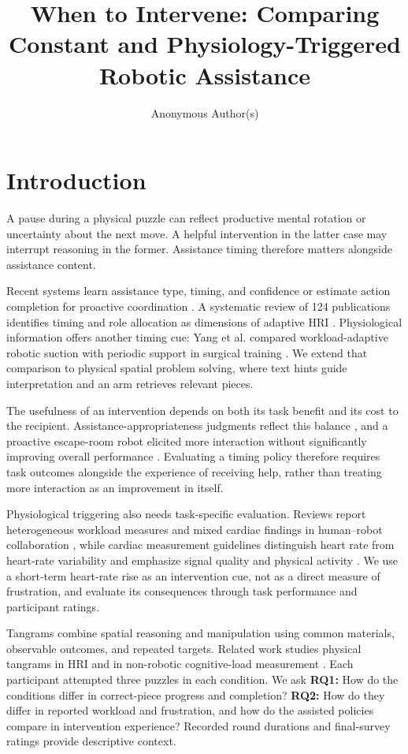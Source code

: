\documentclass[sigconf,anonymous]{aamas}
\title{When to Intervene: Comparing Constant and Physiology-Triggered Robotic Assistance}
\author{Anonymous Author(s)}
\begin{document}
\maketitle


\section{Introduction}

A pause during a physical puzzle can reflect productive mental rotation or uncertainty about the next move. A helpful intervention in the latter case may interrupt reasoning in the former. Assistance timing therefore matters alongside assistance content.

Recent systems learn assistance type, timing, and confidence \cite{andriella2025} or estimate action completion for proactive coordination \cite{delazzari2025}. A systematic review of 124 publications identifies timing and role allocation as dimensions of adaptive HRI \cite{karbouj2026}. Physiological information offers another timing cue: Yang et al. compared workload-adaptive robotic suction with periodic support in surgical training \cite{yang2024}. We extend that comparison to physical spatial problem solving, where text hints guide interpretation and an arm retrieves relevant pieces.

The usefulness of an intervention depends on both its task benefit and its cost to the recipient. Assistance-appropriateness judgments reflect this balance \cite{ramnauth2026}, and a proactive escape-room robot elicited more interaction without significantly improving overall performance \cite{vitry2026}. Evaluating a timing policy therefore requires task outcomes alongside the experience of receiving help, rather than treating more interaction as an improvement in itself.

Physiological triggering also needs task-specific evaluation. Reviews report heterogeneous workload measures and mixed cardiac findings in human--robot collaboration \cite{pereira2025}, while cardiac measurement guidelines distinguish heart rate from heart-rate variability and emphasize signal quality and physical activity \cite{quigley2024}. We use a short-term heart-rate rise as an intervention cue, not as a direct measure of frustration, and evaluate its consequences through task performance and participant ratings.

Tangrams combine spatial reasoning and manipulation using common materials, observable outcomes, and repeated targets. Related work studies physical tangrams in HRI \cite{tabatabaei2025} and in non-robotic cognitive-load measurement \cite{melo2026}. Each participant attempted three puzzles in each condition. We ask \textbf{RQ1:} How do the conditions differ in correct-piece progress and completion? \textbf{RQ2:} How do they differ in reported workload and frustration, and how do the assisted policies compare in intervention experience? Recorded round durations and final-survey ratings provide descriptive context.
\end{document}
